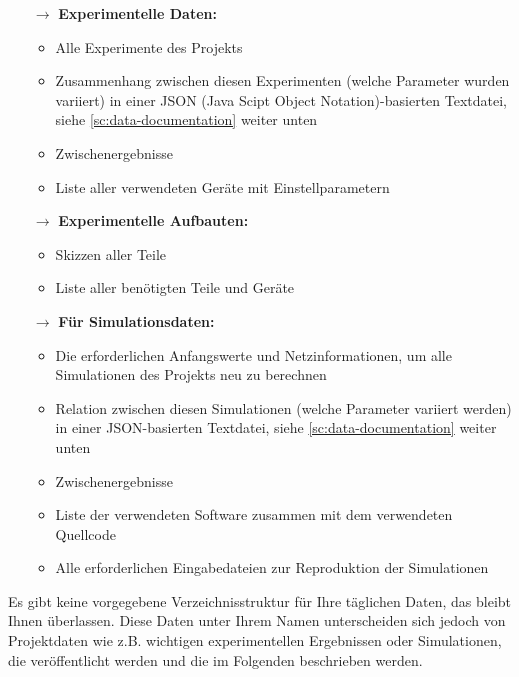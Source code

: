 \begin{itemize}
  \item[$\rightarrow$] \textbf{Experimentelle Daten:}
    \begin{itemize}
      \item Alle Experimente des Projekts
      \item Zusammenhang zwischen diesen Experimenten (welche Parameter wurden
            variiert) in einer JSON (Java Scipt Object Notation)-basierten Textdatei, siehe
            \ref{sc:data-documentation}  weiter unten
      \item Zwischenergebnisse
      \item Liste aller verwendeten Geräte mit Einstellparametern
    \end{itemize}
  \item[$\rightarrow$] \textbf{Experimentelle Aufbauten:}
    \begin{itemize}
      \item Skizzen aller Teile
      \item Liste aller benötigten Teile und Geräte
    \end{itemize}
  \item[$\rightarrow$] \textbf{Für Simulationsdaten:}
    \begin{itemize}
      \item Die erforderlichen Anfangswerte und Netzinformationen, um alle
            Simulationen des Projekts neu zu berechnen
      \item Relation zwischen diesen Simulationen (welche Parameter variiert
            werden) in einer JSON-basierten Textdatei, siehe
            \ref{sc:data-documentation}  weiter unten
      \item Zwischenergebnisse
      \item Liste der verwendeten Software zusammen mit dem verwendeten Quellcode
      \item Alle erforderlichen Eingabedateien zur Reproduktion der Simulationen
    \end{itemize}
\end{itemize}

\noindent Es gibt keine vorgegebene Verzeichnisstruktur für Ihre täglichen
Daten, das bleibt Ihnen überlassen. Diese Daten unter Ihrem Namen unterscheiden
sich jedoch von Projektdaten wie z.B. wichtigen experimentellen Ergebnissen oder
Simulationen, die veröffentlicht werden und die im Folgenden beschrieben werden.

